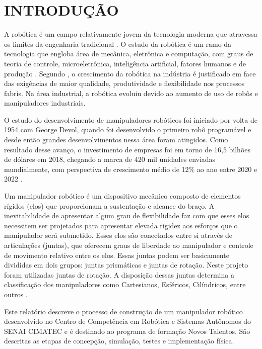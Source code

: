 \chapter{INTRODUÇÃO}
\label{chap:intro}
A robótica é um campo relativamente jovem da tecnologia moderna que atravessa os limites da engenharia tradicional \cite{spong2005robot}. O estudo da robótica é um ramo da tecnologia que engloba área de mecânica, eletrônica e computação, com graus de teoria de controle, microeletrônica, inteligência artificial, fatores humanos e de produção \cite{pimenta}. Segundo \cite{erthal}, o crescimento da robótica na indústria é justificado em face das exigências de maior qualidade, produtividade e flexibilidade nos processos fabris. Na área industrial, a robótica evoluiu devido ao aumento de uso de robôs e manipuladores industriais.

O estudo do desenvolvimento de manipuladores robóticos foi iniciado por volta de 1954 com George Devol, quando foi desenvolvido o primeiro robô programável e desde então grandes desenvolvimentos nessa área foram atingidos. Como resultado desse avanço, o investimento de empresas foi em torno de 16,5 bilhões de dólares em 2018, chegando a marca de 420 mil unidades enviadas mundialmente, com perspectiva de crescimento médio de 12\% ao ano entre 2020 e 2022 \cite{ifr}.

Um manipulador robótico é um dispositivo mecânico composto de elementos rígidos (elos) que proporcionam a sustentação e alcance do braço. A inevitabilidade de apresentar algum grau de flexibilidade faz com que esses elos necessitem ser projetados para apresentar elevada rigidez aos esforços que o manipulador será submetido. Esses elos são conectados entre si através de articulações (juntas), que oferecem graus de liberdade ao manipulador e controle de movimento relativo entre os elos. Essas juntas podem ser basicamente divididas em dois grupos: juntas prismáticas e juntas de rotação. Neste projeto foram utilizadas juntas de rotação. A disposição dessas juntas determina a classificação dos manipuladores como Cartesianos, Esféricos, Cilíndricos, entre outros \cite{robindust}.

Este relatório descreve o processo de construção de um manipulador robótico desenvolvido no Centro de Competência em Robótica e Sistemas Autônomos do SENAI CIMATEC e é destinado ao programa de formação Novos Talentos. São descritas as etapas de concepção, simulação, testes e implementação física.



